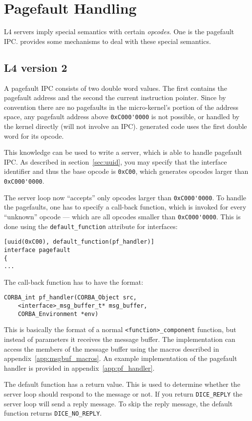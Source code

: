 \chapter{Pagefault Handling}
\label{app:pagefault-handling}

L4 servers imply special semantics with certain {\em opcodes}. One is the pagefault
IPC. \dice{} provides some mechanisms to deal with these special semantics.

\section{L4 version 2}
A pagefault IPC consists of two double word values. The first contains the
pagefault address and the second the current instruction pointer. Since by 
convention there are no pagefaults in the micro-kernel's portion of the 
address space, any pagefault address above \verb|0xC000'0000| is not possible,
or handled by the kernel directly (will not involve an IPC). \dice{} generated 
code uses the first double word for its opcode.

This knowledge can be used to write a server, which is able to handle 
pagefault IPC. As described in section~\ref{sec:uuid}, you may specify that
the interface identifier and thus the base opcode is \verb|0xC00|, which
generates opcodes larger than \verb|0xC000'0000|.

The server loop now ``accepts'' only opcodes larger than \verb|0xC000'0000|.
To handle the pagefaults, one has to specify a call-back function, which is
invoked for every ``unknown'' opcode --- which are all opcodes smaller
than \verb|0xC000'0000|. This is done using the \verb|default_function|
attribute for interfaces:

\begin{verbatim}
[uuid(0xC00), default_function(pf_handler)]
interface pagefault
{
...
\end{verbatim}

The call-back function has to have the format:

\begin{verbatim}
CORBA_int pf_handler(CORBA_Object src,
    <interface>_msg_buffer_t* msg_buffer,
    CORBA_Environment *env)
\end{verbatim}

This is basically the format of a normal \verb|<function>_component|
function, but instead of parameters it receives the message buffer.
The implementation can access the members of the message buffer using
the macros described in appendix~\ref{app:msgbuf_macros}. An example
implementation of the pagefault handler is provided in 
appendix~\ref{app:pf_handler}.

The default function has a return value. This is used to determine
whether the server loop should respond to the message or not. If you 
return \verb|DICE_REPLY| the server loop will send a reply message.
To skip the reply message, the default function returns \verb|DICE_NO_REPLY|.

